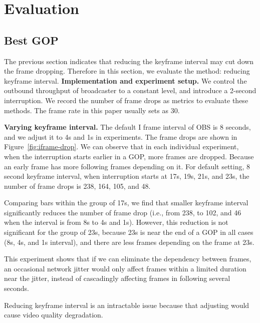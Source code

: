 \section{Evaluation}
\vspace{-0.05in}
\subsection{Best GOP}
The previous section indicates that reducing the keyframe interval may cut down the frame dropping. Therefore in this section, we evaluate the method: reducing keyframe interval.
\textbf{Implementation and experiment setup.}
We control the outbound throughput of broadcaster to a constant level, and introduce a 2-second interruption. We record the number of frame drops as metrics to evaluate these methods. The frame rate in this paper usually sets as 30.


\textbf{Varying keyframe interval.} The default I frame interval of OBS is 8 seconds, and we adjust it to 4s and 1s in experiments. The frame drops are shown in Figure~\ref{fig:iframe-drop}. We can observe that in each individual experiment, when the interruption starts earlier in a GOP, more frames are dropped. Because an early frame has more following frames depending on it. For default setting, 8 second keyframe interval, when interruption starts at 17s, 19s, 21s, and 23s, the number of frame drops is 238, 164, 105, and 48.
\iffalse
Also, the number of frame drop appears to have the same period with the keyframe interval (e.g., when keyframe interval is 4s, the number of frame drops is 102, 47, 103, and 48 when interruption starts at 17s, 19s, 21s, and 23s, demonstrating a period of 4s.).
\fi
Comparing bars within the group of 17s, we find that smaller keyframe interval significantly reduces the number of frame drop (i.e., from 238, to 102, and 46 when the interval is from 8s to 4s and 1s). However, this reduction is not significant for the group of 23s, because 23s is near the end of a GOP in all cases (8s, 4s, and 1s interval), and there are less frames depending on the frame at 23s.

This experiment shows that if we can eliminate the dependency between frames, an occasional network jitter would only affect frames within a limited duration near the jitter, instead of cascadingly affecting frames in following several seconds.

Reducing keyframe interval is an intractable issue because that adjusting would cause video quality degradation.

